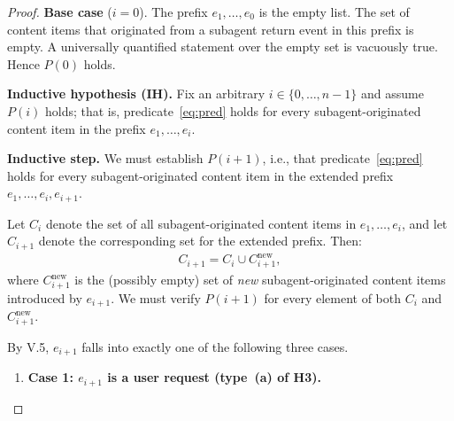 \documentclass[12pt]{article}
\theoremstyle{definition}
\begin{document}
\begin{proof}
\medskip
\noindent\textbf{Base case} ($i = 0$).  The prefix $e_1,\ldots,e_0$ is
the empty list.  The set of content items that originated from a subagent
return event in this prefix is empty.  A universally quantified statement
over the empty set is vacuously true.  Hence $P(0)$ holds.

\medskip
\noindent\textbf{Inductive hypothesis (IH).}  Fix an arbitrary
$i \in \{0,\ldots,n-1\}$ and assume $P(i)$ holds; that is,
predicate~\eqref{eq:pred} holds for every subagent-originated content item
in the prefix $e_1,\ldots,e_i$.

\medskip
\noindent\textbf{Inductive step.}  We must establish $P(i+1)$, i.e., that
predicate~\eqref{eq:pred} holds for every subagent-originated content item
in the extended prefix $e_1,\ldots,e_i,e_{i+1}$.

Let $C_i$ denote the set of all subagent-originated content items in
$e_1,\ldots,e_i$, and let $C_{i+1}$ denote the corresponding set for the
extended prefix.  Then:
\begin{align}
    \label{eq:decomp}
    C_{i+1} = C_i \cup C^{\mathrm{new}}_{i+1},
\end{align}
where $C^{\mathrm{new}}_{i+1}$ is the (possibly empty) set of
\emph{new} subagent-originated content items introduced by $e_{i+1}$.
We must verify $P(i+1)$ for every element of both $C_i$ and
$C^{\mathrm{new}}_{i+1}$.

By V.5, $e_{i+1}$ falls into exactly one of the following three cases.

\begin{enumerate}
    \item \textbf{Case 1: $e_{i+1}$ is a user request (type~(a) of H3).}


\end{enumerate}
\end{proof}
\end{document}

